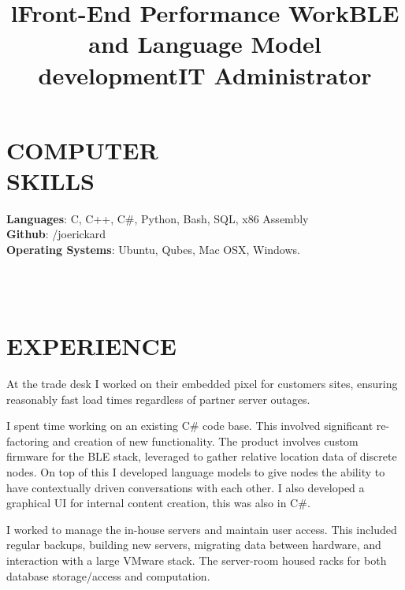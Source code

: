 \documentclass[margin]{res}
\begin{document}
\begin{resume}
\section{COMPUTER\\SKILLS}

\textbf{Languages}: C, C++, C\#, Python, Bash, SQL, x86 Assembly
\\
\textbf{Github}: /joerickard
\\
\textbf{Operating Systems}: 
Ubuntu, Qubes, Mac OSX, Windows.

\begin{format}
\title{l}\\
\\
\body
\end{format}
\section{EXPERIENCE}

\title{\textbf{Front-End Performance Work}}
\begin{position}
At the trade desk I worked on their embedded pixel for customers sites, ensuring reasonably fast load times regardless of partner server outages.
\end{position}

\title{\textbf{BLE and Language Model development}}
\begin{position}
I spent time working on an existing C\# code base. This involved significant re-factoring and creation of new functionality. The product involves custom firmware for the BLE stack, leveraged to gather relative location data of discrete nodes. On top of this I developed language models to give nodes the ability to have contextually driven conversations with each other. I also developed a graphical UI for internal content creation, this was also in C\#.
\end{position}

\title{\textbf{IT Administrator}}
\begin{position}
I worked to manage the in-house servers and maintain user access. This included regular backups, building new servers, migrating data between hardware, and interaction with a large VMware stack. The server-room housed racks for both database storage/access and computation.
\end{position}


\end{resume}
\end{document}

